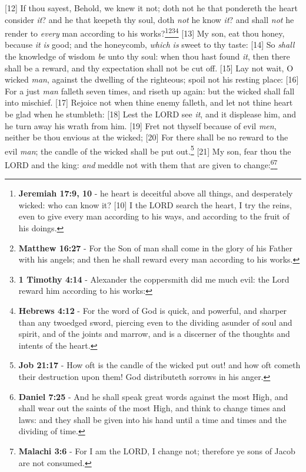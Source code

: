 [12] \textcolor[cmyk]{0.99998,1,0,0}{If thou sayest, Behold, we knew it not; doth not he that pondereth the heart consider \emph{it}? and he that keepeth thy soul, doth \emph{not} he know \emph{it}? and shall \emph{not} he render to \emph{every} man according to his works?}\footnote{\textbf{Jeremiah 17:9, 10} - he heart is deceitful above all things, and desperately wicked: who can know it? [10] I the LORD search the heart, I try the reins, even to give every man according to his ways, and according to the fruit of his doings. }\footnote{\textbf{Matthew 16:27} - For the Son of man shall come in the glory of his Father with his angels; and then he shall reward every man according to his works.}\footnote{\textbf{1 Timothy 4:14} - Alexander the coppersmith did me much evil: the Lord reward him according to his works:}\footnote{\textbf{Hebrews 4:12} - For the word of God is quick, and powerful, and sharper than any twoedged sword, piercing even to the dividing asunder of soul and spirit, and of the joints and marrow, and is a discerner of the thoughts and intents of the heart.}
[13] \textcolor[cmyk]{0.99998,1,0,0}{My son, eat thou honey, because \emph{it} \emph{is} good; and the honeycomb, \emph{which} \emph{is} sweet to thy taste:}
[14] \textcolor[cmyk]{0.99998,1,0,0}{So \emph{shall} the knowledge of wisdom \emph{be} unto thy soul: when thou hast found \emph{it}, then there shall be a reward, and thy expectation shall not be cut off.}
[15] \textcolor[cmyk]{0.99998,1,0,0}{Lay not wait, O wicked \emph{man}, against the dwelling of the righteous; spoil not his resting place:}
[16] \textcolor[cmyk]{0.99998,1,0,0}{For a just \emph{man} falleth seven times, and riseth up again: but the wicked shall fall into mischief.}
[17] \textcolor[cmyk]{0.99998,1,0,0}{Rejoice not when thine enemy falleth, and let not thine heart be glad when he stumbleth:}
[18] \textcolor[cmyk]{0.99998,1,0,0}{Lest the LORD see \emph{it}, and it displease him, and he turn away his wrath from him.}
[19] \textcolor[cmyk]{0.99998,1,0,0}{Fret not thyself because of evil \emph{men}, neither be thou envious at the wicked;}
[20] \textcolor[cmyk]{0.99998,1,0,0}{For there shall be no reward to the evil \emph{man}; the candle of the wicked shall be put out.}\footnote{\textbf{Job 21:17} - How oft is the candle of the wicked put out! and how oft cometh their destruction upon them! God distributeth sorrows in his anger.} 
[21] \textcolor[cmyk]{0.99998,1,0,0}{My son, fear thou the LORD and the king: \emph{and} meddle not with them that are given to change:}\footnote{\textbf{Daniel 7:25} - And he shall speak great words against the most High, and shall wear out the saints of the most High, and think to change times and laws: and they shall be given into his hand until a time and times and the dividing of time.}\footnote{\textbf{Malachi 3:6} - For I am the LORD, I change not; therefore ye sons of Jacob are not consumed.}
